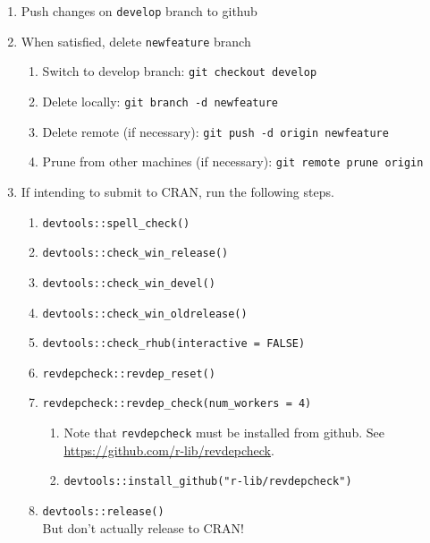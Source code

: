 \documentclass{article}
\begin{document}
\begin{enumerate}
  \item Push changes on \texttt{develop} branch to github
  \item When satisfied, delete \texttt{newfeature} branch
  \begin{enumerate}

    \item Switch to develop branch: \texttt{git checkout develop}

    \item Delete locally: \texttt{git branch -d newfeature}

    \item Delete remote (if necessary): \texttt{git push -d origin newfeature} 
	
	\item Prune from other machines (if necessary): \texttt{git remote prune origin} 

  \end{enumerate}
  
  \item If intending to submit to CRAN, 
        run the following steps.
  
  \begin{enumerate}
	  
    \item \verb+devtools::spell_check()+

	\item \verb+devtools::check_win_release()+

    \item \verb+devtools::check_win_devel()+

	\item \verb+devtools::check_win_oldrelease()+

    \item \verb+devtools::check_rhub(interactive = FALSE)+
	
    \item \verb+revdepcheck::revdep_reset()+

    \item \verb+revdepcheck::revdep_check(num_workers = 4)+
    \begin{enumerate}

      \item Note that \texttt{revdepcheck} must be installed from github. 
            See \url{https://github.com/r-lib/revdepcheck}.

	  \item \verb+devtools::install_github("r-lib/revdepcheck")+

    \end{enumerate}

    \item \verb+devtools::release()+ \\
          But don't actually release to CRAN!
            
  \end{enumerate}
\end{enumerate}
\end{document}
